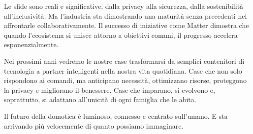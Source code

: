 Le sfide sono reali e significative, dalla privacy alla sicurezza, dalla sostenibilità all'inclusività. Ma l'industria sta dimostrando una maturità senza precedenti nel affrontarle collaborativamente. Il successo di iniziative come Matter dimostra che quando l'ecosistema si unisce attorno a obiettivi comuni, il progresso accelera esponenzialmente.

Nei prossimi anni vedremo le nostre case trasformarsi da semplici contenitori di tecnologia a partner intelligenti nella nostra vita quotidiana. Case che non solo rispondono ai comandi, ma anticipano necessità, ottimizzano risorse, proteggono la privacy e migliorano il benessere. Case che imparano, si evolvono e, soprattutto, si adattano all'unicità di ogni famiglia che le abita.

Il futuro della domotica è luminoso, connesso e centrato sull'umano. E sta arrivando più velocemente di quanto possiamo immaginare.
